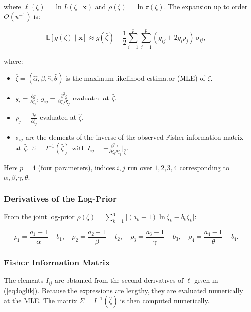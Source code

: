 \documentclass[12pt]{article}
\begin{document}
where \(\ell(\zeta)=\ln L(\zeta\mid\mathbf{x})\) and \(\rho(\zeta)=\ln\pi(\zeta)\).
The expansion up to order \(O(n^{-1})\) is:



\[
\mathbb{E}[g(\zeta)\mid\mathbf{x}] \approx g(\hat{\zeta}) +
\frac12\sum_{i=1}^{p}\sum_{j=1}^{p} (g_{ij}+2g_i\rho_j)\,\sigma_{ij},
\]



where:
\begin{itemize}
    \item \(\hat{\zeta}=(\hat{\alpha},\hat{\beta},\hat{\gamma},\hat{\theta})\) is the
    maximum likelihood estimator (MLE) of \(\zeta\).
    \item \(g_i = \frac{\partial g}{\partial\zeta_i}\), \(g_{ij} = \frac{\partial^2 g}{\partial\zeta_i\partial\zeta_j}\)
    evaluated at \(\hat{\zeta}\).
    \item \(\rho_j = \frac{\partial\rho}{\partial\zeta_j}\) evaluated at \(\hat{\zeta}\).
    \item \(\sigma_{ij}\) are the elements of the inverse of the observed Fisher
    information matrix at \(\hat{\zeta}\): \(\Sigma = I^{-1}(\hat{\zeta})\) with
    \(I_{ij} = -\frac{\partial^2\ell}{\partial\zeta_i\partial\zeta_j}\big|_{\hat{\zeta}}\).
\end{itemize}
Here \(p=4\) (four parameters), indices \(i,j\) run over \(1,2,3,4\) corresponding
to \(\alpha,\beta,\gamma,\theta\).



\subsubsection{Derivatives of the Log-Prior}



From the joint log-prior \(\rho(\zeta) = \sum_{k=1}^{4}\bigl[(a_k-1)\ln\zeta_k - b_k\zeta_k\bigr]\):



\[
\rho_1 = \frac{a_1-1}{\alpha} - b_1,\quad
\rho_2 = \frac{a_2-1}{\beta} - b_2,\quad
\rho_3 = \frac{a_3-1}{\gamma} - b_3,\quad
\rho_4 = \frac{a_4-1}{\theta} - b_4.
\]



\subsubsection{Fisher Information Matrix}



The elements \(I_{ij}\) are obtained from the second derivatives of \(\ell\) given
in (\ref{eq:loglik}). Because the expressions are lengthy, they are evaluated
numerically at the MLE. The matrix \(\Sigma = I^{-1}(\hat{\zeta})\) is then
computed numerically.
\end{document}
